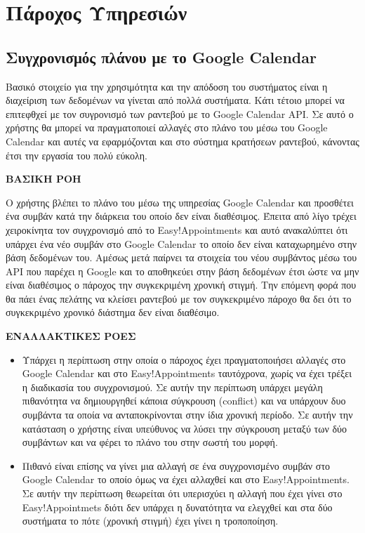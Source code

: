 \section {Πάροχος Υπηρεσιών}
\subsection {Συγχρονισμός πλάνου με το Google Calendar}
Βασικό στοιχείο για την χρησιμότητα και την απόδοση του συστήματος είναι η διαχείριση των δεδομένων να γίνεται από πολλά συστήματα. Κάτι τέτοιο μπορεί να επιτεφθχεί με τον συγρονισμό των ραντεβού με το Google Calendar API. Σε αυτό ο χρήστης θα μπορεί να πραγματοποιεί αλλαγές στο πλάνο του μέσω του Google Calendar και αυτές να εφαρμόζονται και στο σύστημα κρατήσεων ραντεβού, κάνοντας έτσι την εργασία του πολύ εύκολη.

\textbf{ΒΑΣΙΚΗ ΡΟΗ}

Ο χρήστης βλέπει το πλάνο του μέσω της υπηρεσίας Google Calendar και προσθέτει ένα συμβάν κατά την διάρκεια του οποίο δεν είναι διαθέσιμος. Έπειτα από λίγο τρέχει χειροκίνητα τον συγχρονισμό από το Easy!Appointments και αυτό ανακαλύπτει ότι υπάρχει ένα νέο συμβάν στο Google Calendar το οποίο δεν είναι καταχωρημένο στην βάση δεδομένων του. Αμέσως μετά παίρνει τα στοιχεία του νέου συμβάντος μέσω του API που παρέχει η Google και το αποθηκεύει στην βάση δεδομένων έτσι ώστε να μην είναι διαθέσιμος ο πάροχος την συγκεκριμένη χρονική στιγμή. Την επόμενη φορά που θα πάει ένας πελάτης να κλείσει ραντεβού με τον συγκεκριμένο πάροχο θα δει ότι το συγκεκριμένο χρονικό διάστημα δεν είναι διαθέσιμο.

\textbf{ΕΝΑΛΛΑΚΤΙΚΕΣ ΡΟΕΣ}

\begin{itemize}
\item Υπάρχει η περίπτωση στην οποία ο πάροχος έχει πραγματοποιήσει αλλαγές στο Google Calendar και στο Easy!Appointments ταυτόχρονα, χωρίς να έχει τρέξει η διαδικασία του συγχρονισμού. Σε αυτήν την περίπτωση υπάρχει μεγάλη πιθανότητα να δημιουργηθεί κάποια σύγκρουση (conflict) και να υπάρχουν δυο συμβάντα τα οποία να ανταποκρίνονται στην ίδια χρονική περίοδο. Σε αυτήν την κατάσταση ο χρήστης είναι υπεύθυνος να λύσει την σύγκρουση μεταξύ των δύο συμβάντων και να φέρει το πλάνο του στην σωστή του μορφή.
\item Πιθανό είναι επίσης να γίνει μια αλλαγή σε ένα συγχρονισμένο συμβάν στο Google Calendar το οποίο όμως να έχει αλλαχθεί και στο Easy!Appointments. Σε αυτήν την περίπτωση θεωρείται ότι υπερισχύει η αλλαγή που έχει γίνει στο Easy!Appointmets διότι δεν υπάρχει η δυνατότητα να ελεγχθεί και στα δύο συστήματα το πότε (χρονική στιγμή) έχει γίνει η τροποποίηση.
\end{itemize}


